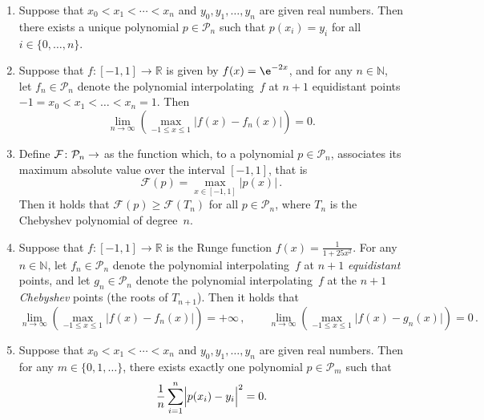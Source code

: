 \documentclass[a4paper]{article}
\begin{document}
\begin{enumerate}

    \item
        Suppose that $x_0 < x_1 < \dotsb < x_n$ and $y_0, y_1, \dotsc, y_n$ are given real numbers.
        Then there exists a unique polynomial $p \in \mathcal P_n$ such that $p(x_i) = y_i$ for all $i \in \{0, \dotsc, n\}$.

    \item
        Suppose that $f \colon [-1, 1] \to \mathbb R$ is given by $f(x) = \e^{-2x}$,
        and for any $n \in \mathbb N$,
        let $f_n \in \mathcal P_n$ denote the polynomial interpolating~$f$ at $n+1$ equidistant points $-1 = x_0 < x_1 < \dotsc < x_n = 1$.
        Then
        \[
            \lim_{n \to \infty} \left( \max_{-1 \leq x \leq 1} \bigl\lvert f(x) - f_n(x) \bigr\rvert \right) = 0.
        \]

    \item
        Define $\mathcal F \colon \mathcal P_n \to \real$ as the function which,
        to a polynomial $p \in \mathcal P_n$, associates its maximum absolute value over the interval $[-1, 1]$,
        that is
        \[
            \mathcal F(p) = \max_{x \in [-1, 1]} \left\lvert p(x) \right\rvert \, .
        \]
        Then it holds that $\mathcal F(p) \geq \mathcal F(T_n)$ for all $p \in \mathcal P_n$,
        where $T_n$ is the Chebyshev polynomial of degree~$n$.


    \item
        Suppose that $f \colon [-1, 1] \to \mathbb R$ is the Runge function $f(x) = \frac{1}{1 + 25 x^2}$.
        For any $n \in \mathbb N$,
        let $f_n \in \mathcal P_n$ denote the polynomial interpolating~$f$ at $n+1$ \emph{equidistant} points,
        and let $g_n \in \mathcal P_n$ denote the polynomial interpolating~$f$ at the $n+1$ \emph{Chebyshev} points (the roots of $T_{n+1}$).
        Then it holds that
        \[
            \lim_{n \to \infty} \left( \max_{-1 \leq x \leq 1} \bigl\lvert f(x) - f_n(x) \bigr\rvert \right) = +\infty \, ,
            \qquad
            \lim_{n \to \infty} \left( \max_{-1 \leq x \leq 1} \bigl\lvert f(x) - g_n(x) \bigr\rvert \right) = 0 \, .
        \]

    \item
        Suppose that $x_0 < x_1 < \dotsb < x_n$ and $y_0, y_1, \dotsc, y_n$ are given real numbers.
        Then for any $m \in \{0, 1, \dotsc\}$,
        there exists exactly one polynomial $p \in \mathcal P_m$ such that 
        \[
            \frac{1}{n} \sum_{i=1}^{n} \Bigl\lvert p(x_i) - y_i \Bigr\rvert^2 = 0.
        \]


\end{enumerate}
\end{document}
